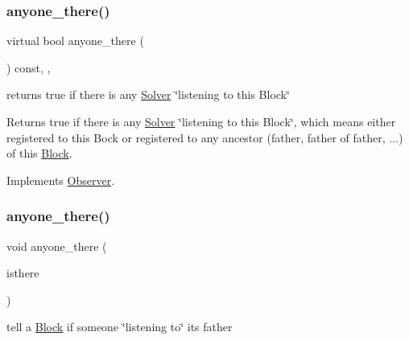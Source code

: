 \subsubsection{\texorpdfstring{anyone\+\_\+there()}{anyone\_there()}\hspace{0.1cm}{\footnotesize\ttfamily [1/2]}}
{\footnotesize\ttfamily virtual bool anyone\+\_\+there (\begin{DoxyParamCaption}\item[{void}]{ }\end{DoxyParamCaption}) const\hspace{0.3cm}{\ttfamily [inline]}, {\ttfamily [override]}, {\ttfamily [virtual]}}



returns true if there is any \mbox{\hyperlink{class_s_m_spp__di__unipi__it_1_1_solver}{Solver}} \char`\"{}listening to this Block\char`\"{} 

Returns true if there is any \mbox{\hyperlink{class_s_m_spp__di__unipi__it_1_1_solver}{Solver}} \char`\"{}listening to this Block\char`\"{}, which means either registered to this Bock or registered to any ancestor (father, father of father, ...) of this \mbox{\hyperlink{class_s_m_spp__di__unipi__it_1_1_block}{Block}}. 

Implements \mbox{\hyperlink{class_s_m_spp__di__unipi__it_1_1_observer_a7d8dd42bea99dfdb6fb967ba17993560}{Observer}}.

\mbox{\label{class_s_m_spp__di__unipi__it_1_1_block_a6aa89187efc49648bd2c01f30a27a81f}} 
\subsubsection{\texorpdfstring{anyone\+\_\+there()}{anyone\_there()}\hspace{0.1cm}{\footnotesize\ttfamily [2/2]}}
{\footnotesize\ttfamily void anyone\+\_\+there (\begin{DoxyParamCaption}\item[{bool}]{isthere }\end{DoxyParamCaption})}



tell a \mbox{\hyperlink{class_s_m_spp__di__unipi__it_1_1_block}{Block}} if someone \char`\"{}listening to\char`\"{} its father 

